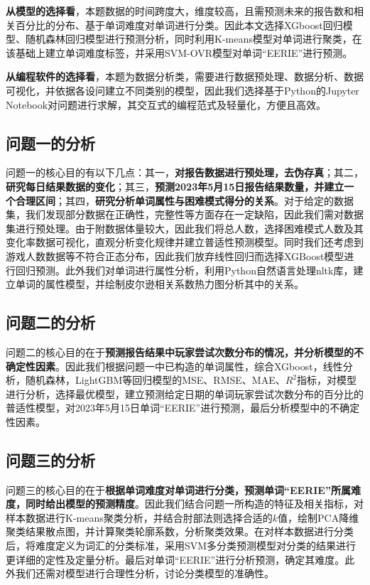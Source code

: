 \documentclass{MathModeling}
\begin{document}
	\textbf{从模型的选择看}，本题数据的时间跨度大，维度较高，且需预测未来的报告数和相关百分比的分布、基于单词难度对单词进行分类。因此本文选择XGboost回归模型、随机森林回归模型进行预测分析，同时利用K-means模型对单词进行聚类，在该基础上建立单词难度标签，并采用SVM-OVR模型对单词“EERIE”进行预测。

	\textbf{从编程软件的选择看}，本题为数据分析类，需要进行数据预处理、数据分析、数据可视化，并依据各设问建立不同类别的模型，因此我们选择基于Python的Jupyter Notebook对问题进行求解，其交互式的编程范式及轻量化，方便且高效。
	
	\subsection{问题一的分析}
	问题一的核心目的有以下几点：{\heiti 其一}，\textbf{对报告数据进行预处理，去伪存真}；{\heiti 其二}，\textbf{研究每日结果数据的变化}；{\heiti 其三}，\textbf{预测2023年5月15日报告结果数量，并建立一个合理区间}；{\heiti 其四}，\textbf{研究分析单词属性与困难模式得分的关系}。对于给定的数据集，我们发现部分数据在正确性，完整性等方面存在一定缺陷，因此我们需对数据集进行预处理。由于附数据体量较大，因此我们将总人数，选择困难模式人数及其变化率数据可视化，直观分析变化规律并建立普适性预测模型。同时我们还考虑到游戏人数数据等不符合正态分布，因此我们放弃线性回归而选择XGBoost模型进行回归预测。此外我们对单词进行属性分析，利用Python自然语言处理nltk库，建立单词的属性模型，并绘制皮尔逊相关系数热力图分析其中的关系。

	\subsection{问题二的分析}
	问题二的核心目的在于\textbf{预测报告结果中玩家尝试次数分布的情况，并分析模型的不确定性因素}。因此我们根据问题一中已构造的单词属性，综合XGboost，线性分析，随机森林，LightGBM等回归模型的MSE、RMSE、MAE、$R^2$指标，对模型进行分析，选择最优模型，建立预测给定日期的单词玩家尝试次数分布的百分比的普适性模型，对2023年5月15日单词“EERIE”进行预测，最后分析模型中的不确定性因素。

	\subsection{问题三的分析}
	问题三的核心目的在于\textbf{根据单词难度对单词进行分类，预测单词“EERIE”所属难度，同时给出模型的预测精度}。因此我们结合问题一所构造的特征及相关指标，对样本数据进行K-means聚类分析，并结合肘部法则选择合适的$k$值，绘制PCA降维聚类结果散点图，并计算聚类轮廓系数，分析聚类效果。在对样本数据进行分类后，将难度定义为词汇的分类标准，采用SVM多分类预测模型对分类的结果进行更详细的定性及定量分析。最后对单词“EERIE”进行分析预测，确定其难度。此外我们还需对模型进行合理性分析，讨论分类模型的准确性。
\end{document}

